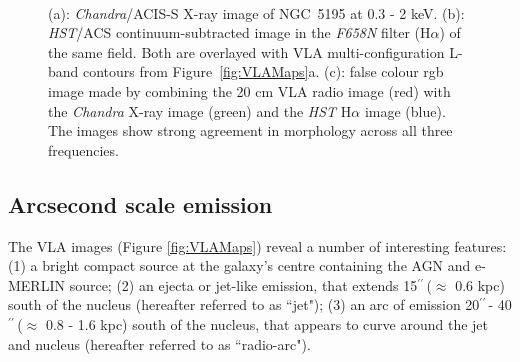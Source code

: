 \documentclass[fleqn,usenatbib]{mnras}
\def\fig{Figure}
\def\arcs{$^{\prime\prime}\,$}
\begin{document}
\begin{figure}
{\centering
{} \hspace{2em}
\\

\caption{(a): \textit{Chandra}/ACIS-S X-ray image of NGC~5195 at 0.3 - 2 keV. (b): \textit{HST}/ACS continuum-subtracted image in the \textit{F658N} filter (H$\alpha$) of the same field. Both are overlayed with VLA multi-configuration L-band contours from \fig~\ref{fig:VLAMaps}a. (c): false colour rgb image made by combining the 20 cm VLA radio image (red) with the \textit{Chandra} X-ray image (green) and the \textit{HST} H$\alpha$ image (blue). The images show strong agreement in morphology across all three frequencies.}
\label{fig:VLAHalpha}
}
\end{figure}


\subsection{Arcsecond scale emission }

The VLA images (Figure \ref{fig:VLAMaps}) reveal a number of interesting features: (1) a bright compact source at the galaxy's centre containing the AGN and e-MERLIN source; (2) an ejecta or jet-like emission, that extends 15\arcs ($\approx$ 0.6 kpc) south of the nucleus (hereafter referred to as ``jet"); (3) an arc of emission 20\arcs - 40\arcs ($\approx$ 0.8 - 1.6 kpc) south of the nucleus, that appears to curve around the jet and nucleus (hereafter referred to as ``radio-arc"). 
\end{document}
